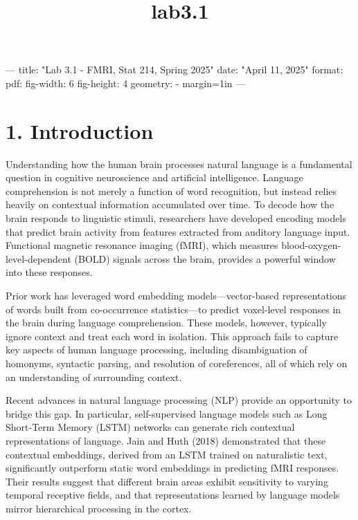 \documentclass[11pt]{article}
\title{lab3.1}
\begin{document}
    
    \maketitle
    
    

    ---
title: "Lab 3.1 - FMRI, Stat 214, Spring 2025"
date: "April 11, 2025"
format:
  pdf:
    fig-width: 6
    fig-height: 4
    geometry:
      - margin=1in
---
    \hypertarget{introduction}{%
\section{1. Introduction}\label{introduction}}

Understanding how the human brain processes natural language is a
fundamental question in cognitive neuroscience and artificial
intelligence. Language comprehension is not merely a function of word
recognition, but instead relies heavily on contextual information
accumulated over time. To decode how the brain responds to linguistic
stimuli, researchers have developed encoding models that predict brain
activity from features extracted from auditory language input.
Functional magnetic resonance imaging (fMRI), which measures
blood-oxygen-level-dependent (BOLD) signals across the brain, provides a
powerful window into these responses.

Prior work has leveraged word embedding models---vector-based
representations of words built from co-occurrence statistics---to
predict voxel-level responses in the brain during language
comprehension. These models, however, typically ignore context and treat
each word in isolation. This approach fails to capture key aspects of
human language processing, including disambiguation of homonyms,
syntactic parsing, and resolution of coreferences, all of which rely on
an understanding of surrounding context.

Recent advances in natural language processing (NLP) provide an
opportunity to bridge this gap. In particular, self-supervised language
models such as Long Short-Term Memory (LSTM) networks can generate rich
contextual representations of language. Jain and Huth (2018)
demonstrated that these contextual embeddings, derived from an LSTM
trained on naturalistic text, significantly outperform static word
embeddings in predicting fMRI responses. Their results suggest that
different brain areas exhibit sensitivity to varying temporal receptive
fields, and that representations learned by language models mirror
hierarchical processing in the cortex.
\end{document}
